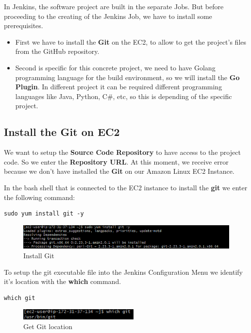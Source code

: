 \documentclass[12pt,a4paper,twoside]{article}
\begin{document}
In Jenkins, the software project are built in the separate Jobs. 
But before proceeding to the creating of the Jenkins Job, we have to install some prerequisites. 


\begin{itemize}
	\item First we have to install the \textbf{Git} on the EC2, to allow to get the project's files from the GitHub repository.

	\item Second is specific for this concrete project, we need to have Golang programming language for the build environment, so we will install the \textbf{Go Plugin}. In different project it can be required different programming languages like Java, Python, C\#, etc, so this is depending of the specific project.
\end{itemize}


\subsection{Install the Git on EC2}


We want to setup the \textbf{Source Code Repository} to have access to the project code. So we enter the \textbf{Repository URL}.
At this moment, we receive error because we don't have installed the \textbf{Git} on our  Amazon Linux EC2 Instance.


In the bash shell that is connected to the EC2 instance to install the \textbf{git} we enter the following command:


\begin{verbatim}
sudo yum install git -y
\end{verbatim}


\begin{figure}[H]
    \centering
        \includegraphics[width=15cm]{images-aws/27-jenkins-install-git.png}
        \caption{Install Git}
\end{figure}


To setup the git executable file into the Jenkins Configuration Menu we identify it's location with the \textbf{which} command.


\begin{verbatim}
which git
\end{verbatim}


\begin{figure}[H]
    \centering
        \includegraphics[width=6cm]{images-aws/28-jenkins-git-on-local.png}
        \caption{Get Git location}
\end{figure}
\end{document}
